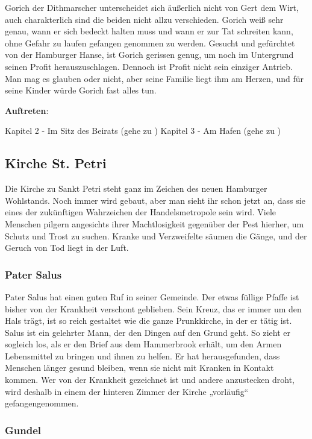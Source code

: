 Gorich der Dithmarscher unterscheidet sich äußerlich nicht von Gert dem Wirt, auch charakterlich sind die beiden nicht allzu verschieden. Gorich weiß sehr genau, wann er sich bedeckt halten muss und wann er zur Tat schreiten kann, ohne Gefahr zu laufen gefangen genommen zu werden. Gesucht und gefürchtet von der Hamburger Hanse, ist Gorich gerissen genug, um noch im Untergrund seinen Profit herauszuschlagen. Dennoch ist Profit nicht sein einziger Antrieb. Man mag es glauben oder nicht, aber seine Familie liegt ihm am Herzen, und für seine Kinder würde Gorich fast alles tun.

\textbf{Auftreten}:

Kapitel 2 - Im Sitz des Beirats (gehe zu \blue{\ref{militär}})
Kapitel 3 - Am Hafen (gehe zu \blue{\ref{imhund}})

\subsection{Kirche St. Petri}

Die Kirche zu Sankt Petri steht ganz im Zeichen des neuen Hamburger Wohlstands. Noch immer wird gebaut, aber man sieht ihr schon jetzt an, dass sie eines der zukünftigen Wahrzeichen der Handelsmetropole sein wird. Viele Menschen pilgern angesichts ihrer Machtlosigkeit gegenüber der Pest hierher, um Schutz und Trost zu suchen. Kranke und Verzweifelte säumen die Gänge, und der Geruch von Tod liegt in der Luft.


\subsubsection*{Pater Salus}
\label{Salus}

Pater Salus hat einen guten Ruf in seiner Gemeinde. Der etwas füllige Pfaffe ist bisher von der Krankheit verschont geblieben. Sein Kreuz, das er immer um den Hals trägt, ist so reich gestaltet wie die ganze Prunkkirche, in der er tätig ist. Salus ist ein gelehrter Mann, der den Dingen auf den Grund geht. So zieht er sogleich los, als er den Brief aus dem Hammerbrook erhält, um den Armen Lebensmittel zu bringen und ihnen zu helfen. Er hat herausgefunden, dass Menschen länger gesund bleiben, wenn sie nicht mit Kranken in Kontakt kommen. Wer von der Krankheit gezeichnet ist und andere anzustecken droht, wird deshalb in einem der hinteren Zimmer der Kirche „vorläufig“ gefangengenommen.

\subsubsection*{Gundel}
\label{Gundel}

